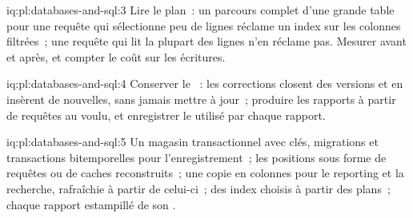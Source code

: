 \begin{solution}{iq:pl:databases-and-sql:3}
Lire le plan~: un parcours complet d'une grande table pour une requête qui sélectionne peu de lignes réclame un index sur les colonnes filtrées~; une requête qui lit
la plupart des lignes n'en réclame pas. Mesurer avant et après, et compter le coût sur les écritures.
\end{solution}

\begin{solution}{iq:pl:databases-and-sql:4}
Conserver le ~: les corrections closent des versions et en insèrent de nouvelles, sans jamais mettre à jour~; produire les rapports à partir de requêtes au  voulu, et enregistrer
le  utilisé par chaque rapport.
\end{solution}

\begin{solution}{iq:pl:databases-and-sql:5}
Un magasin transactionnel avec clés, migrations et transactions bitemporelles pour l'enregistrement~; les positions sous forme de requêtes ou de caches reconstruits~; une copie en colonnes pour
le reporting et la recherche, rafraîchie à partir de celui-ci~; des index choisis à partir des plans~; chaque rapport estampillé de son .
\end{solution}
